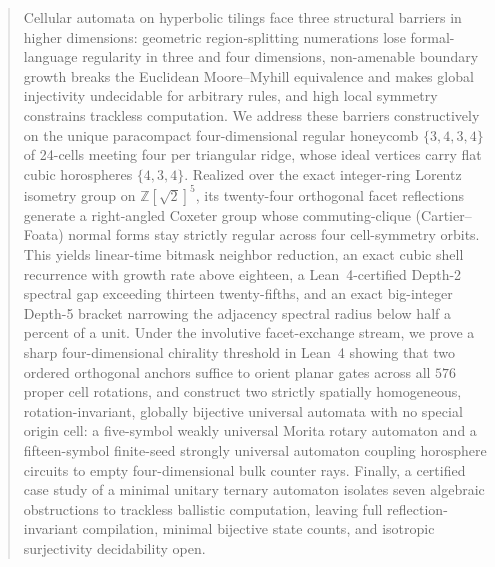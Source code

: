 \begin{abstract}
Cellular automata on hyperbolic tilings face three structural barriers in higher dimensions: geometric region-splitting numerations lose formal-language regularity in three and four dimensions, non-amenable boundary growth breaks the Euclidean Moore--Myhill equivalence and makes global injectivity undecidable for arbitrary rules, and high local symmetry constrains trackless computation. We address these barriers constructively on the unique paracompact four-dimensional regular honeycomb $\{3,4,3,4\}$ of 24-cells meeting four per triangular ridge, whose ideal vertices carry flat cubic horospheres $\{4,3,4\}$. Realized over the exact integer-ring Lorentz isometry group on $\mathbb{Z}[\sqrt{2}]^5$, its twenty-four orthogonal facet reflections generate a right-angled Coxeter group whose commuting-clique (Cartier--Foata) normal forms stay strictly regular across four cell-symmetry orbits. This yields linear-time bitmask neighbor reduction, an exact cubic shell recurrence with growth rate above eighteen, a Lean~4-certified Depth-2 spectral gap exceeding thirteen twenty-fifths, and an exact big-integer Depth-5 bracket narrowing the adjacency spectral radius below half a percent of a unit. Under the involutive facet-exchange stream, we prove a sharp four-dimensional chirality threshold in Lean~4 showing that two ordered orthogonal anchors suffice to orient planar gates across all $576$ proper cell rotations, and construct two strictly spatially homogeneous, rotation-invariant, globally bijective universal automata with no special origin cell: a five-symbol weakly universal Morita rotary automaton and a fifteen-symbol finite-seed strongly universal automaton coupling horosphere circuits to empty four-dimensional bulk counter rays. Finally, a certified case study of a minimal unitary ternary automaton isolates seven algebraic obstructions to trackless ballistic computation, leaving full reflection-invariant compilation, minimal bijective state counts, and isotropic surjectivity decidability open.
\end{abstract}
